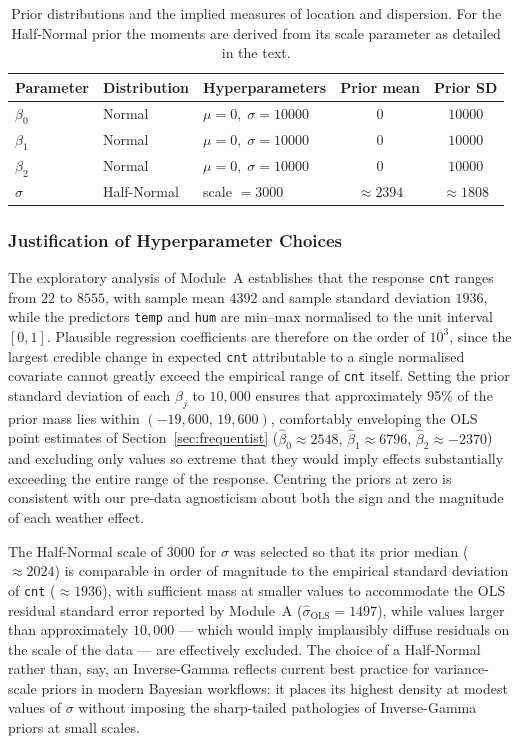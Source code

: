 \begin{table}[htbp]
\centering
\caption{Prior distributions and the implied measures of location and dispersion. For the Half-Normal prior the moments are derived from its scale parameter as detailed in the text.}
\label{tab:priors}
\begin{tabular}{lllcc}
\hline
Parameter & Distribution & Hyperparameters & Prior mean & Prior SD \\
\hline
$\beta_0$ & Normal      & $\mu = 0,\; \sigma = 10000$ & $0$            & $10000$ \\
$\beta_1$ & Normal      & $\mu = 0,\; \sigma = 10000$ & $0$            & $10000$ \\
$\beta_2$ & Normal      & $\mu = 0,\; \sigma = 10000$ & $0$            & $10000$ \\
$\sigma$  & Half-Normal & scale $= 3000$              & $\approx 2394$ & $\approx 1808$ \\
\hline
\end{tabular}
\end{table}

\subsubsection{Justification of Hyperparameter Choices}

The exploratory analysis of Module~A establishes that the response \texttt{cnt} ranges from $22$ to $8555$, with sample mean $4392$ and sample standard deviation $1936$, while the predictors \texttt{temp} and \texttt{hum} are min--max normalised to the unit interval $[0, 1]$. Plausible regression coefficients are therefore on the order of $10^{3}$, since the largest credible change in expected \texttt{cnt} attributable to a single normalised covariate cannot greatly exceed the empirical range of \texttt{cnt} itself. Setting the prior standard deviation of each $\beta_j$ to $10{,}000$ ensures that approximately 95\% of the prior mass lies within $(-19{,}600,\, 19{,}600)$, comfortably enveloping the OLS point estimates of Section~\ref{sec:frequentist} ($\hat\beta_0 \approx 2548,\, \hat\beta_1 \approx 6796,\, \hat\beta_2 \approx -2370$) and excluding only values so extreme that they would imply effects substantially exceeding the entire range of the response. Centring the priors at zero is consistent with our pre-data agnosticism about both the sign and the magnitude of each weather effect.

The Half-Normal scale of $3000$ for $\sigma$ was selected so that its prior median ($\approx 2024$) is comparable in order of magnitude to the empirical standard deviation of \texttt{cnt} ($\approx 1936$), with sufficient mass at smaller values to accommodate the OLS residual standard error reported by Module~A ($\hat\sigma_{\mathrm{OLS}} = 1497$), while values larger than approximately $10{,}000$ — which would imply implausibly diffuse residuals on the scale of the data — are effectively excluded. The choice of a Half-Normal rather than, say, an Inverse-Gamma reflects current best practice for variance-scale priors in modern Bayesian workflows: it places its highest density at modest values of $\sigma$ without imposing the sharp-tailed pathologies of Inverse-Gamma priors at small scales.

